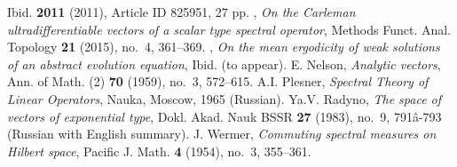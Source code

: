 \documentclass{amsart}
\theoremstyle{plain}
\theoremstyle{definition}
\begin{document}
\begin{thebibliography}{99}
{Ibid.}	
\textbf{2011}	
{(2011)},	
{Article ID 825951},	
{27 pp.}	
{\bysame},	
\textit{On the Carleman ultradifferentiable vectors of a scalar type spectral operator},	
{Methods Funct. Anal. Topology} 
\textbf{21}	
{(2015)},	
{no.~4},	
{361--369}.	
{\bysame},	
\textit{On the mean ergodicity of weak solutions of an abstract evolution equation},	
{Ibid.}	
{(to appear)}.	
{E. Nelson},	
\textit{Analytic vectors},	
{Ann. of Math. (2)}	
\textbf{70}	
{(1959)},	
{no.~3},	
{572--615}.	
{A.I. Plesner},	
\textit{Spectral Theory of Linear Operators},	
{Nauka},	
{Moscow},		
{1965}		
{(Russian)}.
{Ya.V. Radyno},	
\textit{The space of vectors of exponential type},	
{Dokl. Akad. Nauk BSSR}	
\textbf{27}	
{(1983)},	
{no.~9},	
{791â-793}	
{(Russian with English summary)}.
{J. Wermer},	
\textit{Commuting spectral measures on Hilbert space},	
{Pacific J. Math.}	
\textbf{4}	
{(1954)},	
{no.~3},	
{355--361}.	
\end{thebibliography}
\end{document}
